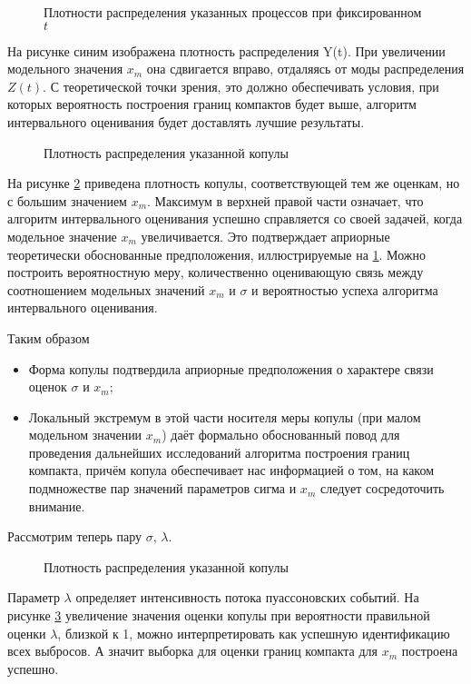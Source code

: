 \begin{figure}[h]
	{}
	\caption{Плотности распределения указанных процессов при фиксированном $t$}
	\label{fig:zy}
\end{figure}
На рисунке синим изображена плотность распределения Y(t). При увеличении модельного значения $x_m$ она сдвигается вправо, отдаляясь от моды распределения $Z(t)$. С теоретической точки зрения, это должно обеспечивать условия, при которых вероятность построения границ компактов будет выше, алгоритм интервального оценивания будет доставлять лучшие результаты.


\begin{figure}[H]
	{}
	\caption{Плотность распределения указанной копулы}
	\label{fig:bigxm}
\end{figure}
На рисунке \ref{fig:bigxm} приведена плотность копулы, соответствующей тем же оценкам, но с большим значением $x_m$. Максимум в верхней правой части означает, что алгоритм интервального оценивания успешно справляется со своей задачей, когда модельное значение $x_m$ увеличивается. Это подтверждает априорные теоретически обоснованные предположения, иллюстрируемые на \ref{fig:zy}. Можно построить вероятностную меру, количественно оценивающую связь между соотношением  модельных значений $x_m$ и $\sigma$ и вероятностью успеха  алгоритма интервального оценивания.

Таким образом
\begin{itemize}
  \item Форма копулы подтвердила априорные предположения о характере связи оценок $\sigma$ и $x_m$;
  \item Локальный экстремум в этой части носителя меры копулы  (при малом модельном значении $x_m$) даёт формально обоснованный повод для проведения дальнейших исследований алгоритма построения границ компакта, причём копула обеспечивает нас информацией о том, на каком подмножестве пар значений параметров сигма и $x_m$ следует сосредоточить внимание.
\end{itemize}

Рассмотрим теперь пару $\sigma$, $\lambda$.
\begin{figure}[H]
	{}
	\caption{ Плотность распределения указанной копулы}
	\label{fig:smalllambda}
\end{figure}
Параметр $\lambda$ определяет интенсивность потока пуассоновских событий. На рисунке \ref{fig:smalllambda} увеличение значения оценки копулы при вероятности правильной оценки $\lambda$, близкой к 1, можно интерпретировать как успешную идентификацию всех выбросов. А значит выборка для оценки границ компакта для $x_m$ построена успешно.

